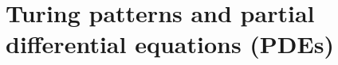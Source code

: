 \section{Turing patterns and partial differential equations (PDEs)}






\begin{comment}

In Keener and Sneyd's foundational textbook on cellular physiology 
(\cite{keener2009mathematical}), the law of mass action is 
introduced as the fundamental law of chemical reactions, 
the process of transformation comprises the living cell. The law of mass 
action states that for the reaction 
\begin{equation*}
    A + B \xrightarrow{k} C,
\end{equation*}
in which chemicals $A$, $B$ react to form the product $C$, the rate of change of the concentration of $C$, 
call it $c$ (in mol$\cdot L^{-1}$) is proportional to the product of the concentration 
of $A$ and $B$, given by $a$ and $b$, respectively. Sequences of interrelated chemical 
reactions induce systems of first order non-linear ordinary differential equations 
(ODEs). These are called a chemical reaction network.
\\

It is suprising then that much of the cell's functionality and behaviour 
can, in theory, be derived from these chemical reaction networks, however
we would not expect all behaviour to be derivable from this model alone.
This is for two reasons,


\end{comment}
